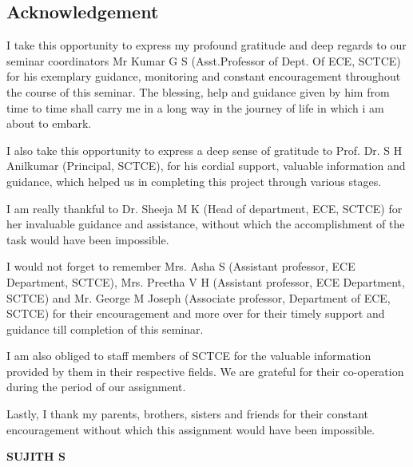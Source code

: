 \documentclass[12pt]{article}
\begin{document}
\begin{center}
\section*{\fontsize{16}{18}\selectfont Acknowledgement}
\end{center}
\vspace{10mm}
\par  I take this opportunity to express my profound gratitude and deep regards to our seminar coordinators Mr Kumar G S (Asst.Professor of Dept. Of ECE, SCTCE) for his exemplary guidance, monitoring and constant encouragement throughout the course of this seminar. The blessing, help and guidance given by him from time to time shall carry me in a long way in the journey of life in which i am about to embark.\\

\par I also take this opportunity to express a deep sense of gratitude to Prof. Dr. S H Anilkumar (Principal, SCTCE), for his cordial support, valuable information and guidance, which helped us in completing this project through various stages.\\

\par I am really thankful to Dr. Sheeja M K (Head of department, ECE, SCTCE) for her invaluable guidance and assistance, without which the accomplishment of the task would have been impossible.\\

\par I would not forget to remember Mrs. Asha S (Assistant professor, ECE Department, SCTCE), Mrs. Preetha V H (Assistant professor, ECE Department, SCTCE) and Mr. George M Joseph (Associate professor, Department of ECE, SCTCE) for their encouragement and more over for their timely support and guidance till completion of this seminar.\\

\par I am also obliged to staff members of SCTCE for the valuable information provided by them in their respective fields. We are grateful for their co-operation during the period of our assignment.\\

\par Lastly, I thank my parents, brothers, sisters and friends for their constant encouragement without which this assignment would have been impossible.\\
\vspace{10mm}
\begin{flushright}
\textbf{SUJITH S}
\end{flushright}
\end{document}

